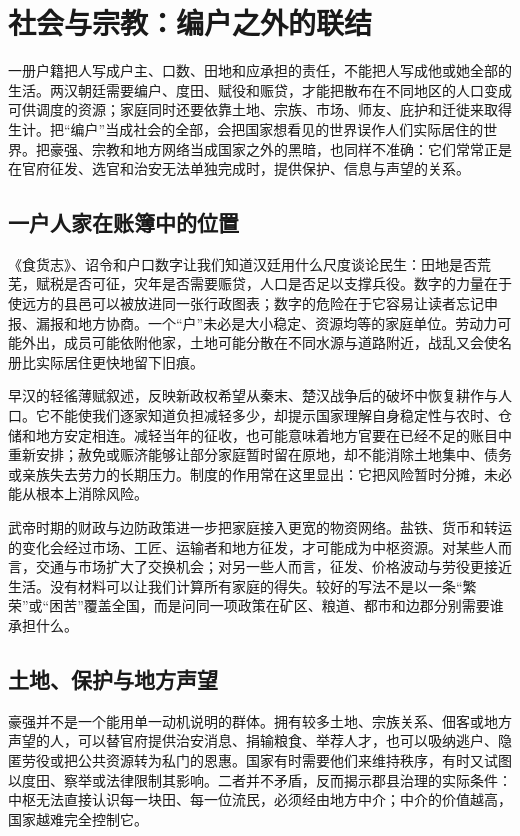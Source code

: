 \section{社会与宗教：编户之外的联结}
\label{sec:synthesis-social-religious}

一册户籍把人写成户主、口数、田地和应承担的责任，不能把人写成他或她全部的生活。两汉朝廷需要编户、度田、赋役和赈贷，才能把散布在不同地区的人口变成可供调度的资源；家庭同时还要依靠土地、宗族、市场、师友、庇护和迁徙来取得生计。把“编户”当成社会的全部，会把国家想看见的世界误作人们实际居住的世界。把豪强、宗教和地方网络当成国家之外的黑暗，也同样不准确：它们常常正是在官府征发、选官和治安无法单独完成时，提供保护、信息与声望的关系。

\subsection{一户人家在账簿中的位置}

《食货志》、诏令和户口数字让我们知道汉廷用什么尺度谈论民生：田地是否荒芜，赋税是否可征，灾年是否需要赈贷，人口是否足以支撑兵役。数字的力量在于使远方的县邑可以被放进同一张行政图表；数字的危险在于它容易让读者忘记申报、漏报和地方协商。一个“户”未必是大小稳定、资源均等的家庭单位。劳动力可能外出，成员可能依附他家，土地可能分散在不同水源与道路附近，战乱又会使名册比实际居住更快地留下旧痕。

早汉的轻徭薄赋叙述，反映新政权希望从秦末、楚汉战争后的破坏中恢复耕作与人口。它不能使我们逐家知道负担减轻多少，却提示国家理解自身稳定性与农时、仓储和地方安定相连。减轻当年的征收，也可能意味着地方官要在已经不足的账目中重新安排；赦免或赈济能够让部分家庭暂时留在原地，却不能消除土地集中、债务或亲族失去劳力的长期压力。制度的作用常在这里显出：它把风险暂时分摊，未必能从根本上消除风险。

武帝时期的财政与边防政策进一步把家庭接入更宽的物资网络。盐铁、货币和转运的变化会经过市场、工匠、运输者和地方征发，才可能成为中枢资源。对某些人而言，交通与市场扩大了交换机会；对另一些人而言，征发、价格波动与劳役更接近生活。没有材料可以让我们计算所有家庭的得失。较好的写法不是以一条“繁荣”或“困苦”覆盖全国，而是问同一项政策在矿区、粮道、都市和边郡分别需要谁承担什么。

\subsection{土地、保护与地方声望}

豪强并不是一个能用单一动机说明的群体。拥有较多土地、宗族关系、佃客或地方声望的人，可以替官府提供治安消息、捐输粮食、举荐人才，也可以吸纳逃户、隐匿劳役或把公共资源转为私门的恩惠。国家有时需要他们来维持秩序，有时又试图以度田、察举或法律限制其影响。二者并不矛盾，反而揭示郡县治理的实际条件：中枢无法直接认识每一块田、每一位流民，必须经由地方中介；中介的价值越高，国家越难完全控制它。

